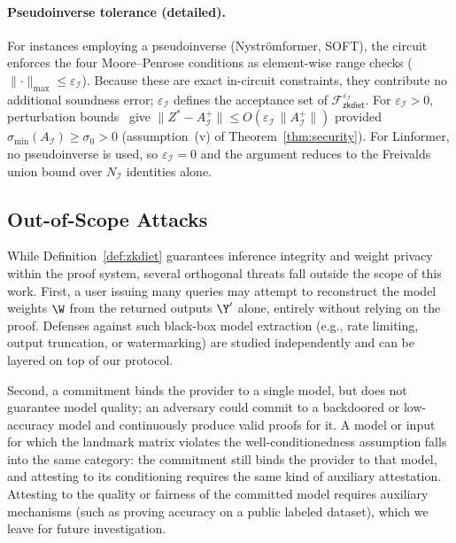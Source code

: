 \documentclass[runningheads]{llncs}
\begin{document}
{%
\paragraph{Pseudoinverse tolerance (detailed).}
For instances employing a pseudoinverse (Nystr\"{o}mformer, SOFT), the circuit enforces the four Moore--Penrose conditions as element-wise range checks ($\lVert\cdot\rVert_{\max}\leq\varepsilon_\mathcal{I}$). Because these are exact in-circuit constraints, they contribute no additional soundness error; $\varepsilon_\mathcal{I}$ defines the acceptance set of $\mathcal{F}^{\varepsilon_\mathcal{I}}_{\mathsf{zkdiet}}$.
For $\varepsilon_\mathcal{I} > 0$, perturbation bounds~\cite{stewart1990matrix} give
$\|Z^{*} - A_\mathcal{I}^{+}\| \le O(\varepsilon_\mathcal{I}\,\|A_\mathcal{I}^{+}\|)$
provided $\sigma_{\min}(A_\mathcal{I}) \geq \sigma_0 > 0$
(assumption~(v) of Theorem~\ref{thm:security}). For Linformer, no pseudoinverse is used, so $\varepsilon_\mathcal{I}{=}0$ and the argument reduces to the Freivalds union bound over $N_\mathcal{I}$ identities alone.

\subsection{Out-of-Scope Attacks}
\label{appx:out-of-scope}

While Definition~\ref{def:zkdiet} guarantees inference integrity and weight privacy within the proof system, several orthogonal threats fall outside the scope of this work. First, a user issuing many queries may attempt to reconstruct the model weights $\W$ from the returned outputs $\Y'$ alone, entirely without relying on the proof. Defenses against such black-box model extraction (e.g., rate limiting, output truncation, or watermarking) are studied independently and can be layered on top of our protocol.

Second, a commitment binds the provider to a single model, but does not guarantee model quality; an adversary could commit to a backdoored or low-accuracy model and continuously produce valid proofs for it. A model or input for which the landmark matrix violates the well-conditionedness assumption falls into the same category: the commitment still binds the provider to that model, and attesting to its conditioning requires the same kind of auxiliary attestation. Attesting to the quality or fairness of the committed model requires auxiliary mechanisms (such as proving accuracy on a public labeled dataset), which we leave for future investigation.
}%
\end{document}
